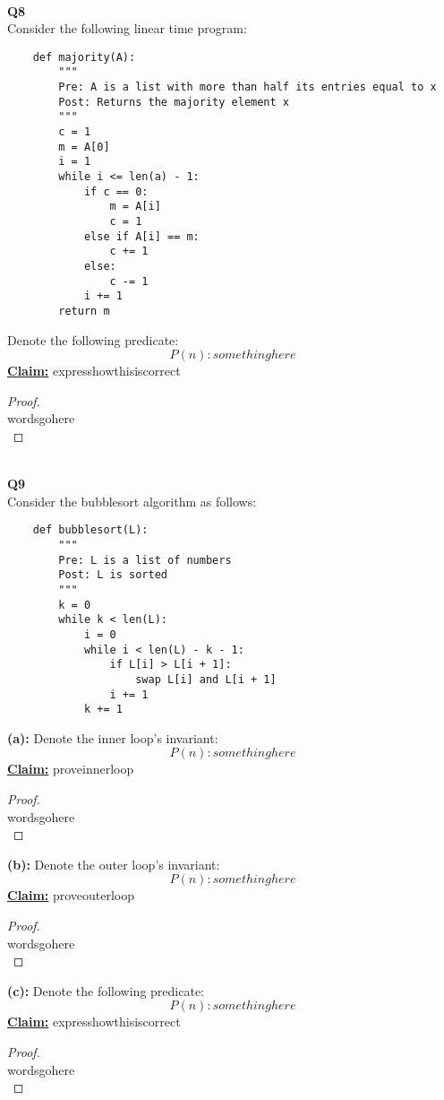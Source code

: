 \documentclass[12pt]{article}
\begin{document}
\leavevmode\\
\textbf{Q8} \\
Consider the following linear time program:
\begin{lstlisting}
    def majority(A):
        """
        Pre: A is a list with more than half its entries equal to x
        Post: Returns the majority element x
        """
        c = 1
        m = A[0]
        i = 1
        while i <= len(a) - 1:
            if c == 0:
                m = A[i]
                c = 1
            else if A[i] == m:
                c += 1
            else:
                c -= 1
            i += 1
        return m
\end{lstlisting}
Denote the following predicate:
\[P(n): somethinghere\]
\textbf{\underline{Claim:}} expresshowthisiscorrect
\begin{proof}
\leavevmode\\
    wordsgohere \\
\end{proof}
\leavevmode\\
\textbf{Q9} \\
Consider the bubblesort algorithm as follows:
\begin{lstlisting}
    def bubblesort(L):
        """
        Pre: L is a list of numbers
        Post: L is sorted
        """
        k = 0
        while k < len(L):
            i = 0
            while i < len(L) - k - 1:
                if L[i] > L[i + 1]:
                    swap L[i] and L[i + 1]
                i += 1
            k += 1
\end{lstlisting}
\textbf{(a):} Denote the inner loop's invariant:
\[P(n): somethinghere\]
\textbf{\underline{Claim:}} proveinnerloop
\begin{proof}
\leavevmode\\
    wordsgohere \\
\end{proof}
\leavevmode
\textbf{(b):} Denote the outer loop's invariant:
\[P(n): somethinghere\]
\textbf{\underline{Claim:}} proveouterloop
\begin{proof}
\leavevmode\\
    wordsgohere \\
\end{proof}
\leavevmode
\textbf{(c):} Denote the following predicate:
\[P(n): somethinghere\]
\textbf{\underline{Claim:}} expresshowthisiscorrect
\begin{proof}
\leavevmode\\
    wordsgohere \\
\end{proof}
\end{document}
